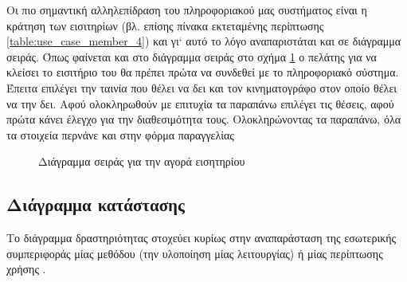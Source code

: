 \documentclass{assignment}
\begin{document}
Οι πιο σημαντική αλληλεπίδραση του πληροφοριακού μας συστήματος είναι η κράτηση των εισιτηρίων (βλ. επίσης πίνακα εκτεταμένης περίπτωσης \ref{table:use_case_member_4}) και γι` αυτό το λόγο αναπαριστάται και σε διάγραμμα σειράς. Όπως φαίνεται και στο διάγραμμα σειράς στο σχήμα \ref{fig:sequence_ticket} ο πελάτης για να κλείσει το εισιτήριο του θα πρέπει πρώτα να συνδεθεί με το πληροφοριακό σύστημα. Έπειτα επιλέγει την ταινία που θέλει να δει και τον κινηματογράφο στον οποίο θέλει να την δει. Αφού ολοκληρωθούν με επιτυχία τα παραπάνω επιλέγει τις θέσεις, αφού πρώτα κάνει έλεγχο για την διαθεσιμότητα τους. Ολοκληρώνοντας τα παραπάνω, όλα τα στοιχεία περνάνε και στην φόρμα παραγγελίας 

\begin{landscape}
\begin{figure}
\begin{center}
\caption{Διάγραμμα σειράς για την αγορά εισητηρίου}
\label{fig:sequence_ticket}
\end{center}
\end{figure}
\end{landscape}

\subsection{Διάγραμμα κατάστασης}

Το διάγραμμα δραστηριότητας στοχεύει κυρίως στην αναπαράσταση της εσωτερικής συμπεριφοράς μίας μεθόδου (την υλοποίηση μίας λειτουργίας) ή μίας περίπτωσης χρήσης \cite{virvou_uml}.
\end{document}
